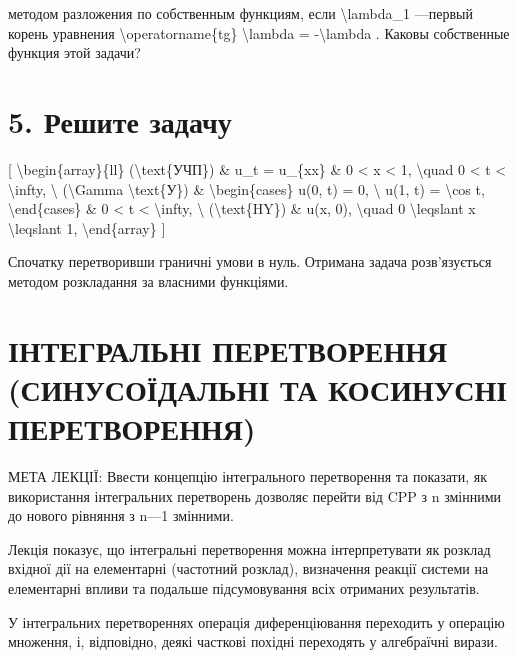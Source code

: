 \documentclass[
]{article}
\begin{document}
методом разложения по собственным функциям, если
\textbackslash lambda\_1 ---первый корень уравнения
\textbackslash operatorname\{tg\} \textbackslash lambda =
-\textbackslash lambda . Каковы собственные функция этой задачи?

\section{5. Решите
задачу}\label{ux440ux435ux448ux438ux442ux435-ux437ux430ux434ux430ux447ux443}

{[} \textbackslash begin\{array\}\{ll\} (\textbackslash text\{УЧП\}) \&
u\_t = u\_\{xx\} \& 0 \textless{} x \textless{} 1, \textbackslash quad 0
\textless{} t \textless{} \textbackslash infty, \textbackslash{}
(\textbackslash Gamma \textbackslash text\{У\}) \&
\textbackslash begin\{cases\} u(0, t) = 0, \textbackslash{} u(1, t) =
\textbackslash cos t, \textbackslash end\{cases\} \& 0 \textless{} t
\textless{} \textbackslash infty, \textbackslash{}
(\textbackslash text\{HY\}) \& u(x, 0), \textbackslash quad 0
\textbackslash leqslant x \textbackslash leqslant 1,
\textbackslash end\{array\} {]}

Спочатку перетворивши граничні умови в нуль. Отримана задача
розв'язується методом розкладання за власними функціями.

\section{ІНТЕГРАЛЬНІ ПЕРЕТВОРЕННЯ (СИНУСОЇДАЛЬНІ ТА КОСИНУСНІ
ПЕРЕТВОРЕННЯ)}\label{ux456ux43dux442ux435ux433ux440ux430ux43bux44cux43dux456-ux43fux435ux440ux435ux442ux432ux43eux440ux435ux43dux43dux44f-ux441ux438ux43dux443ux441ux43eux457ux434ux430ux43bux44cux43dux456-ux442ux430-ux43aux43eux441ux438ux43dux443ux441ux43dux456-ux43fux435ux440ux435ux442ux432ux43eux440ux435ux43dux43dux44f}

МЕТА ЛЕКЦІЇ: Ввести концепцію інтегрального перетворення та показати, як
використання інтегральних перетворень дозволяє перейти від CPP з n
змінними до нового рівняння з n---1 змінними.

Лекція показує, що інтегральні перетворення можна інтерпретувати як
розклад вхідної дії на елементарні (частотний розклад), визначення
реакції системи на елементарні впливи та подальше підсумовування всіх
отриманих результатів.

У інтегральних перетвореннях операція диференціювання переходить у
операцію множення, і, відповідно, деякі часткові похідні переходять у
алгебраїчні вирази.
\end{document}
